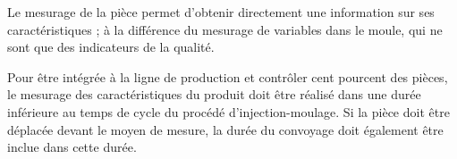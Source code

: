 %
%

Le mesurage de la pièce permet d'obtenir directement une information sur ses caractéristiques ; à la différence du mesurage de variables dans le moule, qui ne sont que des indicateurs de la qualité.

Pour être intégrée à la ligne de production et contrôler cent pourcent des pièces, le mesurage des caractéristiques du produit doit être réalisé dans une durée inférieure au temps de cycle du procédé d'injection-moulage.
Si la pièce doit être déplacée devant le moyen de mesure, la durée du convoyage doit également être inclue dans cette durée.

